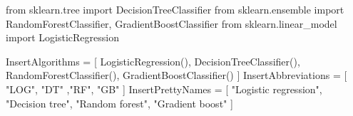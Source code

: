 from sklearn.tree import DecisionTreeClassifier
from sklearn.ensemble import RandomForestClassifier, GradientBoostClassifier
from sklearn.linear_model import LogisticRegression

InsertAlgorithms = [
  LogisticRegression(),
  DecisionTreeClassifier(),
  RandomForestClassifier(),
  GradientBoostClassifier()
]
InsertAbbreviations = [
  "LOG", "DT" ,"RF", "GB"
]
InsertPrettyNames = [
  "Logistic regression",
  "Decision tree",
  "Random forest",
  "Gradient boost"
]
